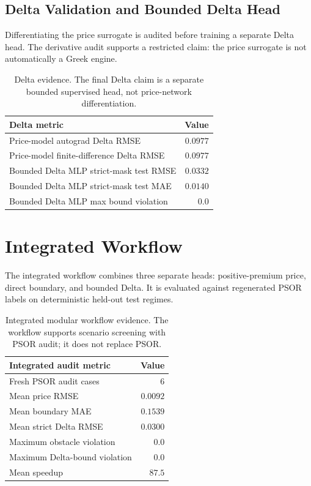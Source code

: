 \documentclass[11pt]{article}
\begin{document}
\subsection{Delta Validation and Bounded Delta Head}
Differentiating the price surrogate is audited before training a separate Delta head. The derivative audit supports a restricted claim: the price surrogate is not automatically a Greek engine.
\begin{table}[h]
\centering
\small
\begin{tabular}{lr}
\toprule
Delta metric & Value \\
\midrule
Price-model autograd Delta RMSE & $0.0977$ \\
Price-model finite-difference Delta RMSE & $0.0977$ \\
Bounded Delta MLP strict-mask test RMSE & $0.0332$ \\
Bounded Delta MLP strict-mask test MAE & $0.0140$ \\
Bounded Delta MLP max bound violation & $0.0$ \\
\bottomrule
\end{tabular}
\caption{Delta evidence. The final Delta claim is a separate bounded supervised head, not price-network differentiation.}
\label{tab:delta}
\end{table}

\section{Integrated Workflow}
The integrated workflow combines three separate heads: positive-premium price, direct boundary, and bounded Delta. It is evaluated against regenerated PSOR labels on deterministic held-out test regimes.

\begin{table}[h]
\centering
\small
\begin{tabular}{lr}
\toprule
Integrated audit metric & Value \\
\midrule
Fresh PSOR audit cases & $6$ \\
Mean price RMSE & $0.0092$ \\
Mean boundary MAE & $0.1539$ \\
Mean strict Delta RMSE & $0.0300$ \\
Maximum obstacle violation & $0.0$ \\
Maximum Delta-bound violation & $0.0$ \\
Mean speedup & $87.5$ \\
\bottomrule
\end{tabular}
\caption{Integrated modular workflow evidence. The workflow supports scenario screening with PSOR audit; it does not replace PSOR.}
\label{tab:integrated}
\end{table}
\end{document}

